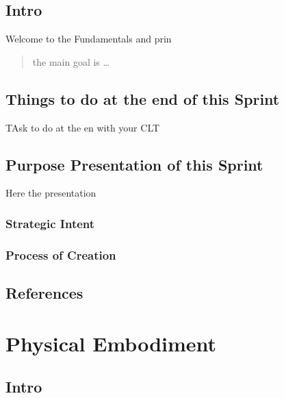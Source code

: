 \documentclass[
]{book}
\begin{document}
\hypertarget{intro-2}{%
\section{Intro}\label{intro-2}}

Welcome to the Fundamentals and prin

\begin{quote}
the main goal is \ldots{}
\end{quote}

\hypertarget{things-to-do-at-the-end-of-this-sprint}{%
\section{Things to do at the end of this Sprint}\label{things-to-do-at-the-end-of-this-sprint}}

TAsk to do at the en with your CLT

\hypertarget{purpose-presentation-of-this-sprint}{%
\section{Purpose Presentation of this Sprint}\label{purpose-presentation-of-this-sprint}}

Here the presentation

\hypertarget{strategic-intent}{%
\subsection{Strategic Intent}\label{strategic-intent}}

\hypertarget{process-of-creation}{%
\subsection{Process of Creation}\label{process-of-creation}}

\hypertarget{references-1}{%
\section{References}\label{references-1}}

\hypertarget{physical-embodiment}{%
\chapter{Physical Embodiment}\label{physical-embodiment}}

\hypertarget{intro-3}{%
\section{Intro}\label{intro-3}}
\end{document}
